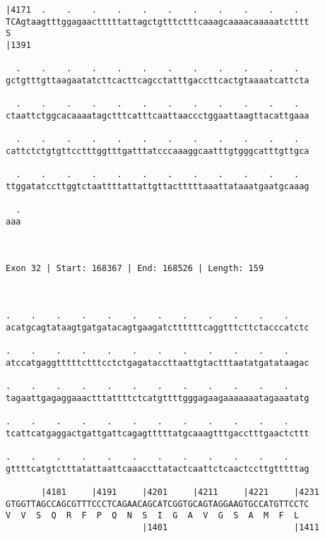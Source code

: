 \documentclass{article}
\begin{document}
\begin{Verbatim}
|4171  .    .    .    .    .    .    .    .    .    .    .  
TCAgtaagtttggagaactttttattagctgtttctttcaaagcaaaacaaaaatctttt
S                                                           
|1391                                                       
  
  .    .    .    .    .    .    .    .    .    .    .    .  
gctgtttgttaagaatatcttcacttcagcctatttgaccttcactgtaaaatcattcta
                                                            
  .    .    .    .    .    .    .    .    .    .    .    .  
ctaattctggcacaaaatagctttcatttcaattaaccctggaattaagttacattgaaa
                                                            
  .    .    .    .    .    .    .    .    .    .    .    .  
cattctctgtgttcctttggtttgatttatcccaaaggcaatttgtgggcatttgttgca
                                                            
  .    .    .    .    .    .    .    .    .    .    .    .  
ttggatatccttggtctaattttattattgttactttttaaattataaatgaatgcaaag
                                                            
  .
aaa
   
   
 
Exon 32 | Start: 168367 | End: 168526 | Length: 159



.    .    .    .    .    .    .    .    .    .    .    .    
acatgcagtataagtgatgatacagtgaagatcttttttcaggtttcttctacccatctc
                                                            
.    .    .    .    .    .    .    .    .    .    .    .    
atccatgaggtttttctttcctctgagataccttaattgtactttaatatgatataagac
                                                            
.    .    .    .    .    .    .    .    .    .    .    .    
tagaattgagaggaaactttattttctcatgttttgggagaagaaaaaaatagaaatatg
                                                            
.    .    .    .    .    .    .    .    .    .    .    .    
tcattcatgaggactgattgattcagagtttttatgcaaagtttgacctttgaactcttt
                                                            
.    .    .    .    .    .    .    .    .    .    .    .    
gttttcatgtctttatattaattcaaaccttatactcaattctcaactccttgtttttag
                                                            
       |4181     |4191     |4201     |4211     |4221     |4231
GTGGTTAGCCAGCGTTTCCCTCAGAACAGCATCGGTGCAGTAGGAAGTGCCATGTTCCTC
V  V  S  Q  R  F  P  Q  N  S  I  G  A  V  G  S  A  M  F  L  
                           |1401                         |1411
  

\end{Verbatim}
\end{document}
